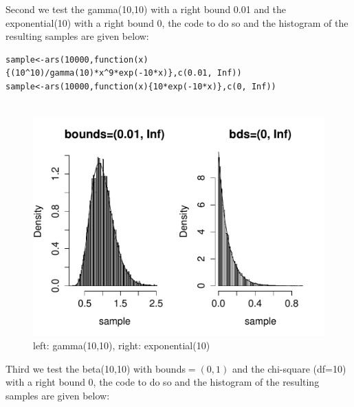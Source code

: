 \documentclass[11pt, oneside]{article}   	%
\begin{document}
Second we test the gamma(10,10) with a right bound 0.01 and the exponential(10) with a right bound 0, the code to do so and the histogram of the resulting samples are given below:\newline

\begin{lstlisting}[frame=single]
sample<-ars(10000,function(x){(10^10)/gamma(10)*x^9*exp(-10*x)},c(0.01, Inf))
sample<-ars(10000,function(x){10*exp(-10*x)},c(0, Inf))


\end{lstlisting}
\clearpage
\begin{figure}[htbp!]
 \centering
\caption{left: gamma(10,10), right: exponential(10)}
  \includegraphics[width=1.0\textwidth]{gammaexp}
\end{figure}

Third we test the beta(10,10) with bounds$=(0,1)$ and the chi-square (df=10) with a right bound 0, the code to do so and the histogram of the resulting samples are given below: \newline
\end{document}
